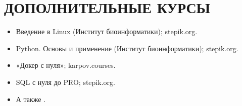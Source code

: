 \section{ДОПОЛНИТЕЛЬНЫЕ КУРСЫ}

    \begin{itemize}
        \setlength\itemsep{-.5em}
        \item Введение в Linux (Институт биоинформатики); stepik.org.
        \item Python. Основы и применение (Институт биоинформатики); stepik.org.
        \item «Докер с нуля»; karpov.courses.
        \item SQL с нуля до PRO; stepik.org.
        \item А также .
    \end{itemize}
    
    \vspace{-.4em}
